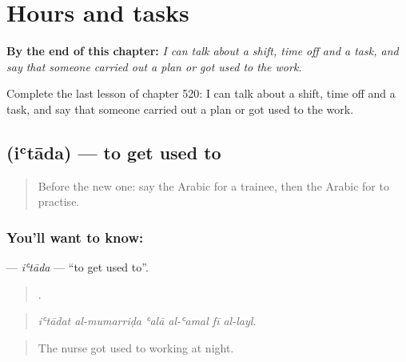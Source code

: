 
\chapter{Hours and tasks}
\label{ch:ar-hours-and-tasks}

\begin{chapteropening}
\textbf{By the end of this chapter:} \emph{I can talk about a shift, time off and a task, and say that someone carried out a plan or got used to the work.}

Complete the last lesson of chapter 520: I can talk about a shift, time off and a task, and say that someone carried out a plan or got used to the work.
\end{chapteropening}

\section[\texorpdfstring{\ar{اعتاد} (iʿtāda)}{اعتاد (iʿtāda)}]{ (iʿtāda) — to get used to}

\label{lesson:AR-C520-itada}



\begin{quote}
Before the new one: say the Arabic for a trainee, then the Arabic for to practise.
\end{quote}

\subsection*{You'll want to know: }
\textbf{} — \emph{iʿtāda} — \textquotedblleft{}to get used to\textquotedblright{}.

\begin{quote}
     .
\end{quote}

\begin{quote}
\emph{iʿtādat al-mumarriḍa ʿalā al-ʿamal fī al-layl.}
\end{quote}

\begin{quote}
The nurse got used to working at night.
\end{quote}


